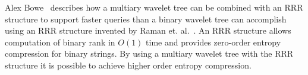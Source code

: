 Alex Bowe~ describes how a multiary wavelet tree can be combined with an RRR structure to support faster queries than a binary wavelet tree can accomplish using an RRR structure invented by Raman et. al.~.
An RRR structure allows computation of binary rank in $O(1)$ time and provides zero-order entropy compression for binary strings.
By using a multiary wavelet tree with the RRR structure it is possible to achieve higher order entropy compression.




